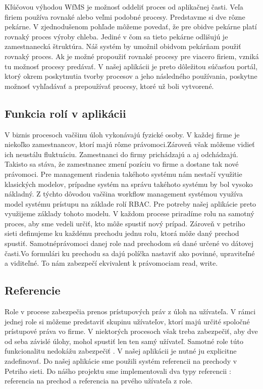 Kľúčovou výhodou WfMS je možnosť oddeliť proces od aplikačnej časti. Veľa firiem používa rovnaké alebo veľmi podobné procesy. Predstavme si dve rôzne pekárne. V zjednodušenom pohľade môžeme povedať, že pre obidve pekárne platí rovnaký proces výroby chleba. Jediné v čom sa tieto pekárne odlišujú je zamestnanecká štruktúra. Náš systém by umožnil obidvom pekárňam použiť rovnaký proces. Ak je možné propoužiť rovnaké procesy pre viacero firiem, vzniká tu možnosť procesy predávať. V našej aplikácii je preto dôležitou súčasťou portál, ktorý okrem poskytnutia tvorby procesov a jeho následného používania, poskytne možnosť vyhľadávať a prepoužívať procesy, ktoré už boli vytvorené.  


\subsection{Funkcia rolí v aplikácii}
V biznis procesoch vačšinu úloh vykonávajú fyzické osoby. V každej firme je niekoľko zamestnancov, ktorí majú rôzne právomoci.Zároveň však môžeme vidieť ich neustálu fluktuáciu. Zamestnanci do firmy prichádzajú a aj odchádzajú. Takisto sa stáva, že zamestnanec zmení pozíciu vo firme a dostane tak nové právomoci. Pre management riadenia takéhoto systému nám nestačí využitie klasických modelov, prípadne systém na správu takéhoto systému by bol vysoko nákladný. Z týchto dôvodou vačšina workflow management systémou využíva model systému prístupu na základe rolí RBAC. Pre potreby našej aplikácie preto využijeme základy tohoto modelu. V každom procese priradíme rolu na samotný proces, aby sme vedeli určiť, kto môže spustiť nový prípad. Zároveň v petriho sieti definujeme ku každému prechodu jednu rolu, ktorá môže daný prechod spustiť. Samotnéprávomoci danej role nad prechodom sú dané určené vo dátovej časti.Vo formulári ku prechodu sa dajú políčka nastaviť ako povinné, upraviteľné a viditeľné. To nám zabezpečí ekvivalent k právomociam read, write. 

\subsection{Referencie}
Role v procese zabezpečia prenos prístupových práv z úloh na užívateľa. V rámci jednej role si môžeme predstaviť skupinu užívateľov, ktorí majú určité spoločné prístupové práva vo firme. V niektorých procesoch však treba zabezpečiť, aby dve od seba závislé úlohy, mohol spustiť len ten samý užívateľ. Samotné role túto funkcionalitu nedokážu zabezpečiť . V našej aplikácii je nutné ju explicitne zadefinovať. Do našej aplikácie sme použili systém referencii na prechody v Petriho sieti. Do nášho projektu sme implementovali dva typy referencii : referencia na prechod a referencia na prvého užívateľa z role. 

